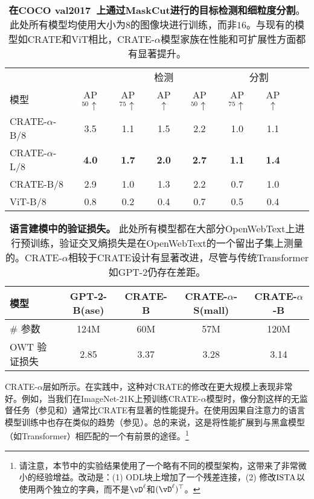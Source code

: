 \documentclass[../../book-main_zh.tex]{subfiles}
\begin{document}
\begin{table}
    \centering
    \begin{tabular}{@{}lcccccccc@{}}
    \toprule
     &  & \multicolumn{3}{c}{检测} &  \multicolumn{3}{c}{分割} \\ 
    模型 & AP$_{50} \uparrow $ & AP$_{75} \uparrow $ & AP $\uparrow$ & AP$_{50} \uparrow$ & AP$_{75} \uparrow $ & AP $\uparrow$ \\ 
    \midrule
    \midrule
    CRATE-\(\alpha\)-B/8 & 3.5 & 1.1 & 1.5 & 2.2 & 1.0 & 1.1 \\
    CRATE-\(\alpha\)-L/8 & \textbf{4.0} & \textbf{1.7} & \textbf{2.0} & \textbf{2.7} & \textbf{1.1} & \textbf{1.4} \\
    \midrule
    \color{gray}CRATE-B/8 & \color{gray}2.9 & \color{gray}1.0 & \color{gray}1.3 & \color{gray}2.2 & \color{gray}0.7 & \color{gray}1.0 \\
    \color{gray}ViT-B/8 & \color{gray}0.8 & \color{gray}0.2 & \color{gray}0.4 & \color{gray}0.7 & \color{gray}0.5 & \color{gray}0.4 \\
    \bottomrule
    \end{tabular}
    \caption{\small \textbf{在COCO val2017~\citep{lin2014microsoft}上通过MaskCut进行的目标检测和细粒度分割}。此处所有模型均使用大小为\(8\)的图像块进行训练，而非\(16\)。与现有的模型如CRATE和ViT相比，CRATE-\(\alpha\)模型家族在性能和可扩展性方面都有显著提升。}
    \label{tab:crate_alpha_detection_segmentation}
\end{table}

\begin{table}
    \centering 
    \begin{tabular}{@{}lcccc@{}}
    \toprule
    模型 & GPT-2-B(ase) & CRATE-B & CRATE-\(\alpha\)-S(mall) & CRATE-\(\alpha\)-B \\ 
    \midrule
    \midrule
    \# 参数 & 124M & 60M & 57M & 120M \\
    OWT 验证损失 & 2.85 & 3.37 & 3.28 & 3.14 \\
    \bottomrule
    \end{tabular}
    \caption{\small\textbf{语言建模中的验证损失。} 此处所有模型都在大部分OpenWebText上进行预训练，验证交叉熵损失是在OpenWebText的一个留出子集上测量的。CRATE-\(\alpha\)相较于CRATE设计有显著改进，尽管与传统Transformer如GPT-2仍存在差距。}
    \label{tab:crate_alpha_lm}
\end{table}

CRATE-\(\alpha\)层如所示。在实践中，这种对CRATE的修改在更大规模上表现非常好。例如，当我们在ImageNet-21K上预训练CRATE-\(\alpha\)模型时，像分割这样的无监督任务（参见和）通常比CRATE有显著的性能提升。在使用因果自注意力的语言模型训练中也存在类似的趋势（参见）。总的来说，这是将性能扩展到与黑盒模型（如Transformer）相匹配的一个有前景的途径。\footnote{请注意，本节中的实验结果使用了一个略有不同的模型架构，这带来了非常微小的经验增益。改动是：(1) ODL块上增加了一个残差连接，(2) 修改\(\operatorname{ISTA}\)以使用两个独立的字典，而不是\(\vD^{\ell}\)和\((\vD^{\ell})^{\top}\)。}
\end{document}
